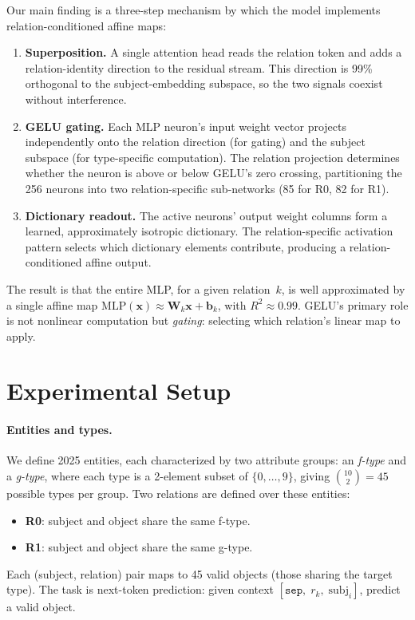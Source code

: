 \documentclass[11pt,a4paper]{article}
\newcommand{\bW}{\mathbf{W}}
\newcommand{\bb}{\mathbf{b}}
\newcommand{\bx}{\mathbf{x}}
\begin{document}
Our main finding is a three-step mechanism by which the model
implements relation-conditioned affine maps:

\begin{enumerate}
\item \textbf{Superposition.} A single attention head reads the
  relation token and adds a relation-identity direction to the residual
  stream. This direction is 99\% orthogonal to the subject-embedding
  subspace, so the two signals coexist without interference.

\item \textbf{GELU gating.} Each MLP neuron's input weight vector
  projects independently onto the relation direction (for gating) and
  the subject subspace (for type-specific computation). The relation
  projection determines whether the neuron is above or below GELU's
  zero crossing, partitioning the 256 neurons into two
  relation-specific sub-networks (85 for R0, 82 for R1).

\item \textbf{Dictionary readout.} The active neurons' output weight
  columns form a learned, approximately isotropic dictionary. The
  relation-specific activation pattern selects which dictionary elements
  contribute, producing a relation-conditioned affine output.
\end{enumerate}

The result is that the entire MLP, for a given relation~$k$, is well
approximated by a single affine map $\mathrm{MLP}(\bx) \approx
\bW_k \bx + \bb_k$, with $R^2 \approx 0.99$. GELU's primary role is
not nonlinear computation but \emph{gating}: selecting which relation's
linear map to apply.

\section{Experimental Setup}
\label{sec:setup}

\paragraph{Entities and types.}
We define 2025 entities, each characterized by two attribute groups:
an \emph{f-type} and a \emph{g-type}, where each type is a 2-element
subset of $\{0,\dots,9\}$, giving $\binom{10}{2} = 45$ possible types
per group. Two relations are defined over these entities:
\begin{itemize}
\item \textbf{R0}: subject and object share the same f-type.
\item \textbf{R1}: subject and object share the same g-type.
\end{itemize}
Each (subject, relation) pair maps to 45 valid objects (those sharing
the target type). The task is next-token prediction: given context
$[\texttt{sep},\; r_k,\; \text{subj}_i]$, predict a valid object.
\end{document}
